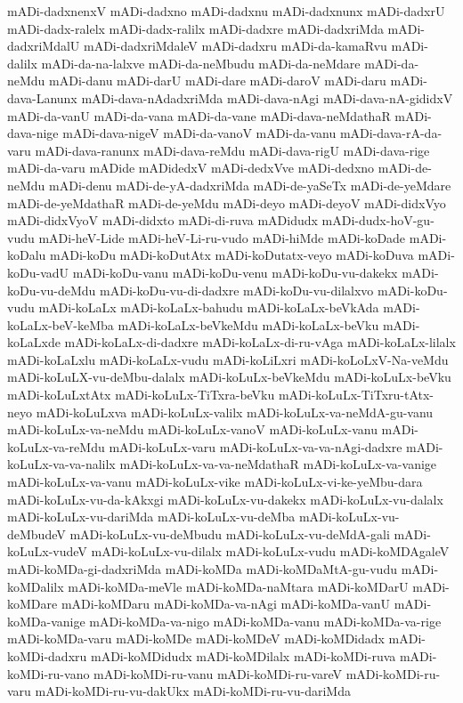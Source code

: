 {mADi-dadxnenxV
mADi-dadxno
mADi-dadxnu
mADi-dadxnunx
mADi-dadxrU
mADi-dadx-ralelx
mADi-dadx-ralilx
mADi-dadxre
mADi-dadxriMda
mADi-dadxriMdalU
mADi-dadxriMdaleV
mADi-dadxru
mADi-da-kamaRvu
mADi-dalilx
mADi-da-na-lalxve
mADi-da-neMbudu
mADi-da-neMdare
mADi-da-neMdu
mADi-danu
mADi-darU
mADi-dare
mADi-daroV
mADi-daru
mADi-dava-Lanunx
mADi-dava-nAdadxriMda
mADi-dava-nAgi
mADi-dava-nA-gididxV
mADi-da-vanU
mADi-da-vana
mADi-da-vane
mADi-dava-neMdathaR
mADi-dava-nige
mADi-dava-nigeV
mADi-da-vanoV
mADi-da-vanu
mADi-dava-rA-da-varu
mADi-dava-ranunx
mADi-dava-reMdu
mADi-dava-rigU
mADi-dava-rige
mADi-da-varu
mADide
mADidedxV
mADi-dedxVve
mADi-dedxno
mADi-de-neMdu
mADi-denu
mADi-de-yA-dadxriMda
mADi-de-yaSeTx
mADi-de-yeMdare
mADi-de-yeMdathaR
mADi-de-yeMdu
mADi-deyo
mADi-deyoV
mADi-didxVyo
mADi-didxVyoV
mADi-didxto
mADi-di-ruva
mADidudx
mADi-dudx-hoV-gu-vudu
mADi-heV-Lide
mADi-heV-Li-ru-vudo
mADi-hiMde
mADi-koDade
mADi-koDalu
mADi-koDu
mADi-koDutAtx
mADi-koDutatx-veyo
mADi-koDuva
mADi-koDu-vadU
mADi-koDu-vanu
mADi-koDu-venu
mADi-koDu-vu-dakekx
mADi-koDu-vu-deMdu
mADi-koDu-vu-di-dadxre
mADi-koDu-vu-dilalxvo
mADi-koDu-vudu
mADi-koLaLx
mADi-koLaLx-bahudu
mADi-koLaLx-beVkAda
mADi-koLaLx-beV-keMba
mADi-koLaLx-beVkeMdu
mADi-koLaLx-beVku
mADi-koLaLxde
mADi-koLaLx-di-dadxre
mADi-koLaLx-di-ru-vAga
mADi-koLaLx-lilalx
mADi-koLaLxlu
mADi-koLaLx-vudu
mADi-koLiLxri
mADi-koLoLxV-Na-veMdu
mADi-koLuLX-vu-deMbu-dalalx
mADi-koLuLx-beVkeMdu
mADi-koLuLx-beVku
mADi-koLuLxtAtx
mADi-koLuLx-TiTxra-beVku
mADi-koLuLx-TiTxru-tAtx-neyo
mADi-koLuLxva
mADi-koLuLx-valilx
mADi-koLuLx-va-neMdA-gu-vanu
mADi-koLuLx-va-neMdu
mADi-koLuLx-vanoV
mADi-koLuLx-vanu
mADi-koLuLx-va-reMdu
mADi-koLuLx-varu
mADi-koLuLx-va-va-nAgi-dadxre
mADi-koLuLx-va-va-nalilx
mADi-koLuLx-va-va-neMdathaR
mADi-koLuLx-va-vanige
mADi-koLuLx-va-vanu
mADi-koLuLx-vike
mADi-koLuLx-vi-ke-yeMbu-dara
mADi-koLuLx-vu-da-kAkxgi
mADi-koLuLx-vu-dakekx
mADi-koLuLx-vu-dalalx
mADi-koLuLx-vu-dariMda
mADi-koLuLx-vu-deMba
mADi-koLuLx-vu-deMbudeV
mADi-koLuLx-vu-deMbudu
mADi-koLuLx-vu-deMdA-gali
mADi-koLuLx-vudeV
mADi-koLuLx-vu-dilalx
mADi-koLuLx-vudu
mADi-koMDAgaleV
mADi-koMDa-gi-dadxriMda
mADi-koMDa
mADi-koMDaMtA-gu-vudu
mADi-koMDalilx
mADi-koMDa-meVle
mADi-koMDa-naMtara
mADi-koMDarU
mADi-koMDare
mADi-koMDaru
mADi-koMDa-va-nAgi
mADi-koMDa-vanU
mADi-koMDa-vanige
mADi-koMDa-va-nigo
mADi-koMDa-vanu
mADi-koMDa-va-rige
mADi-koMDa-varu
mADi-koMDe
mADi-koMDeV
mADi-koMDidadx
mADi-koMDi-dadxru
mADi-koMDidudx
mADi-koMDilalx
mADi-koMDi-ruva
mADi-koMDi-ru-vano
mADi-koMDi-ru-vanu
mADi-koMDi-ru-vareV
mADi-koMDi-ru-varu
mADi-koMDi-ru-vu-dakUkx
mADi-koMDi-ru-vu-dariMda
}

